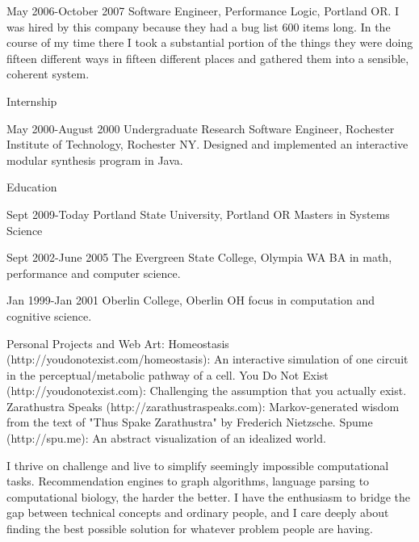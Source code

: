 May 2006-October 2007  Software Engineer, Performance Logic, Portland OR.  I was hired by this company because they had a bug list 600 items long.  In the course of my time there I took a substantial portion of the things they were doing fifteen different ways in fifteen different places and gathered them into a sensible, coherent system.


Internship

May 2000-August 2000  Undergraduate Research Software Engineer, Rochester Institute of Technology, Rochester NY.  Designed and implemented an interactive modular synthesis program in Java. 


Education

Sept 2009-Today  Portland State University, Portland OR
Masters in Systems Science

Sept 2002-June 2005  The Evergreen State College, Olympia WA
BA in math, performance and computer science.

Jan 1999-Jan 2001  Oberlin College, Oberlin OH
focus in computation and cognitive science.


Personal Projects and Web Art:
  Homeostasis (http://youdonotexist.com/homeostasis): An interactive simulation of one circuit in the perceptual/metabolic pathway of a cell.
  You Do Not Exist (http://youdonotexist.com): Challenging the assumption that you actually exist.
  Zarathustra Speaks (http://zarathustraspeaks.com): Markov-generated wisdom from the text of "Thus Spake Zarathustra" by Frederich Nietzsche.
  Spume (http://spu.me): An abstract visualization of an idealized world.

I thrive on challenge and live to simplify seemingly impossible computational tasks.  Recommendation engines to graph algorithms, language parsing to computational biology, the harder the better.  I have the enthusiasm to bridge the gap between technical concepts and ordinary people, and I care deeply about finding the best possible solution for whatever problem people are having.  

